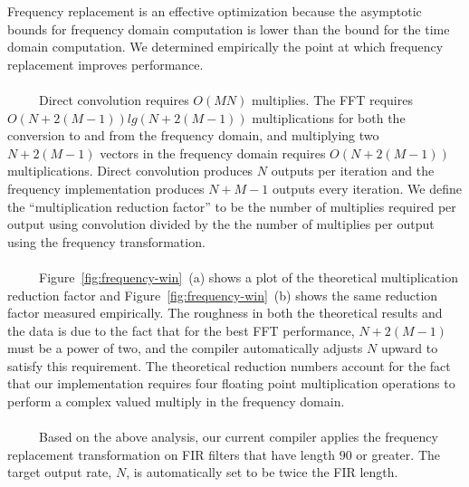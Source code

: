 \begin{figure*}[t]
{Frequency replacement is an effective optimization because the
asymptotic bounds for frequency domain computation is lower than the
bound for the time domain computation.  We determined empirically the
point at which frequency replacement improves performance.
\\ ~ \\
~~~~~Direct convolution requires $O(MN)$ multiplies.  The FFT requires
$O(N+2(M-1))lg(N+2(M-1))$ multiplications for both the conversion to
and from the frequency domain, and multiplying two $N+2(M-1)$ vectors
in the frequency domain requires $O(N+2(M-1))$ multiplications.
Direct convolution produces $N$ outputs per iteration and the
frequency implementation produces $N+M-1$ outputs every iteration.  We
define the ``multiplication reduction factor'' to be the number of
multiplies required per output using convolution divided by the the
number of multiplies per output using the frequency transformation.
\\ ~ \\
~~~~~Figure~\ref{fig:frequency-win}~(a) shows a plot of the theoretical
multiplication reduction factor and Figure~\ref{fig:frequency-win}~(b)
shows the same reduction factor measured empirically.  The roughness
in both the theoretical results and the data is due to the fact that
for the best FFT performance, $N+2(M-1)$ must be a power of two, and the
compiler automatically adjusts $N$ upward to satisfy this
requirement. The theoretical reduction numbers account for the fact
that our implementation requires four floating point multiplication
operations to perform a complex valued multiply in the frequency
domain.
\\ ~ \\
~~~~~Based on the above analysis, our current compiler applies the
frequency replacement transformation on FIR filters that have length
$90$ or greater. The target output rate, $N$, is automatically set to
be twice the FIR length.
}
\end{figure*}

